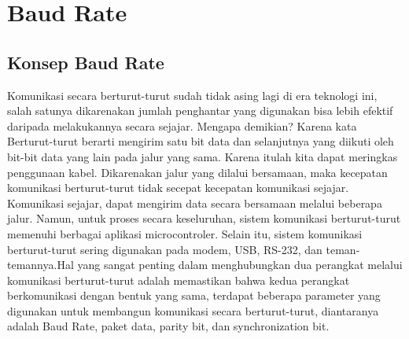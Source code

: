 
\section{Baud Rate}

\subsection{Konsep Baud Rate}
Komunikasi secara berturut-turut sudah tidak asing lagi di era teknologi ini, salah satunya dikarenakan jumlah penghantar yang digunakan bisa lebih efektif daripada melakukannya secara sejajar. Mengapa demikian? Karena kata Berturut-turut berarti mengirim satu bit data dan selanjutnya yang diikuti oleh bit-bit data yang lain pada jalur yang sama. Karena itulah kita dapat meringkas penggunaan kabel. Dikarenakan jalur yang dilalui bersamaan, maka kecepatan komunikasi berturut-turut tidak secepat kecepatan komunikasi sejajar. Komunikasi sejajar, dapat mengirim data secara bersamaan melalui beberapa jalur. Namun, untuk proses secara keseluruhan, sistem komunikasi berturut-turut memenuhi berbagai aplikasi microcontroler. Selain itu, sistem komunikasi berturut-turut sering digunakan pada modem, USB, RS-232, dan teman-temannya.Hal yang sangat penting dalam menghubungkan dua perangkat melalui komunikasi berturut-turut adalah memastikan bahwa kedua perangkat berkomunikasi dengan bentuk yang sama, terdapat beberapa parameter yang digunakan untuk membangun komunikasi secara berturut-turut, diantaranya adalah Baud Rate, paket data, parity bit, dan synchronization bit.

